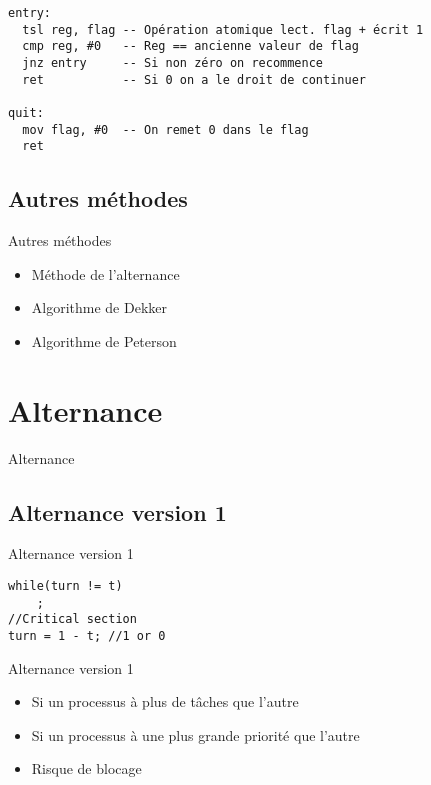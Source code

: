 \begin{frame}[containsverbatim]{\sectitle}
\begin{exampleblock}{\subsectitle}
\begin{verbatim}
entry:
  tsl reg, flag -- Opération atomique lect. flag + écrit 1
  cmp reg, #0   -- Reg == ancienne valeur de flag
  jnz entry     -- Si non zéro on recommence
  ret           -- Si 0 on a le droit de continuer

quit:
  mov flag, #0  -- On remet 0 dans le flag
  ret
\end{verbatim}
\end{exampleblock}
\end{frame}

\def\subsectitle{Autres méthodes}
\subsection{\subsectitle}
\begin{frame}{\sectitle}
\begin{block}{\subsectitle}
\begin{itemize}
\item Méthode de l'alternance
\item Algorithme de Dekker
\item Algorithme de Peterson
\end{itemize}
\end{block}
\end{frame}
\def\sectitle{Alternance}
\section{\sectitle}
\begin{frame}[containsverbatim]{\sectitle}
\def\subsectitle{Alternance version 1}
\subsection{\subsectitle}
\begin{exampleblock}{\subsectitle}
\begin{verbatim}
while(turn != t)
    ;
//Critical section
turn = 1 - t; //1 or 0
\end{verbatim}
\end{exampleblock}

\begin{alertblock}{\subsectitle}
\begin{itemize}
    \item Si un processus à plus de tâches que l'autre
    \item Si un processus à une plus grande priorité que l'autre
    \item Risque de blocage
\end{itemize}
\end{alertblock}
\end{frame}

